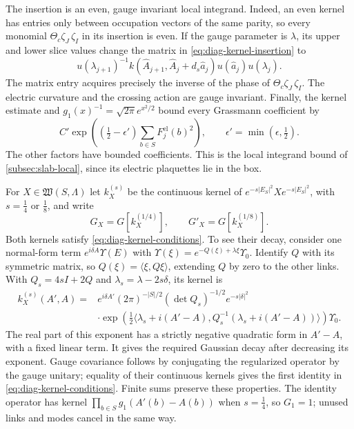 \documentclass[11pt,letterpaper,reqno]{amsart}
\begin{document}
The insertion is an even, gauge invariant local integrand. Indeed,
an even kernel has entries only between occupation vectors of the
same parity, so every monomial
$\Theta_c\zeta_J\,\zeta_I$ in its insertion is even. If the gauge
parameter is $\lambda$, its upper and lower slice values change
the matrix in \eqref{eq:diag-kernel-insertion} to
\[
 u(\lambda_{j+1})^{-1}
   k(\widehat A_{j+1},\widehat A_j+d_s\widehat a_j)
       u(\widehat a_j)u(\lambda_j).
\]
The matrix entry acquires precisely the inverse of the phase of
$\Theta_c\zeta_J\,\zeta_I$. The electric curvature and the crossing
action are gauge invariant. Finally, the kernel estimate and
$g_1(x)^{-1}=\sqrt{2\pi}e^{x^2/2}$ bound every Grassmann coefficient
by
\begin{equation}\label{eq:diag-insertion-growth}
 C'\exp\left((\tfrac12-\epsilon')
                 \sum_{b\in S}F_j^{\mathrm{el}}(b)^2\right),
 \qquad\epsilon'=\min(\epsilon,\tfrac12).
\end{equation}
The other factors have bounded coefficients. This is the local
integrand bound of \cref{subsec:slab-local}, since its electric
plaquettes lie in the box.

For $X\in\mathfrak W(S,\Lambda)$ let $k_X^{(s)}$ be the continuous
kernel of $e^{-s|E_S|^2}Xe^{-s|E_S|^2}$, with $s=\tfrac14$ or
$\tfrac18$, and write
\begin{equation}\label{eq:diag-operator-insertions}
 G_X=G[k_X^{(1/4)}],\qquad G'_X=G[k_X^{(1/8)}].
\end{equation}
Both kernels satisfy \eqref{eq:diag-kernel-conditions}. To see their
decay, consider one normal-form term $e^{i\delta A}\Upsilon(E)$ with
$\Upsilon(\xi)=e^{-Q(\xi)+\lambda\xi}\Upsilon_0$. Identify $Q$
with its symmetric matrix, so $Q(\xi)=\langle\xi,Q\xi\rangle$,
extending $Q$ by
zero to the other links. With $Q_s=4sI+2Q$ and
$\lambda_s=\lambda-2s\delta$, its kernel is
\begin{equation}\label{eq:diag-regularized-kernel}
 \begin{split}
 k_X^{(s)}(A',A)={}&e^{i\delta A'}(2\pi)^{-|S|/2}
          (\det Q_s)^{-1/2}e^{-s|\delta|^2}\\
 &\cdot\exp\left(\tfrac12
  \langle\lambda_s+i(A'-A),Q_s^{-1}
                  (\lambda_s+i(A'-A))\rangle\right)\Upsilon_0.
 \end{split}
\end{equation}
The real part of this exponent has a strictly negative quadratic
form in $A'-A$, with a fixed linear term. It gives the required
Gaussian decay after decreasing its exponent. Gauge covariance
follows by conjugating the regularized operator by the gauge
unitary; equality of their continuous kernels gives the first
identity in \eqref{eq:diag-kernel-conditions}. Finite sums preserve
these properties. The identity operator has kernel
$\prod_{b\in S}g_1(A'(b)-A(b))$ when $s=\tfrac14$, so
$G_1=1$; unused links and modes cancel in the same way.
\end{document}
